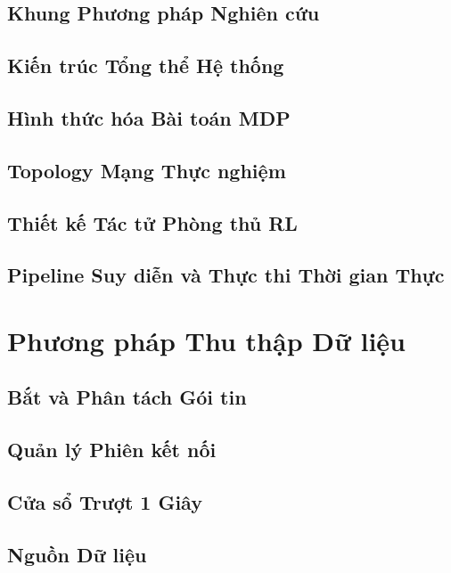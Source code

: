 \documentclass[12pt,a4paper,twoside]{report}
\begin{document}
\subsection{Khung Phương pháp Nghiên cứu}

\subsection{Kiến trúc Tổng thể Hệ thống}

\subsection{Hình thức hóa Bài toán MDP}

\subsection{Topology Mạng Thực nghiệm}

\subsection{Thiết kế Tác tử Phòng thủ RL}

\subsection{Pipeline Suy diễn và Thực thi Thời gian Thực}

\section{Phương pháp Thu thập Dữ liệu}

\subsection{Bắt và Phân tách Gói tin}

\subsection{Quản lý Phiên kết nối}

\subsection{Cửa sổ Trượt 1 Giây}

\subsection{Nguồn Dữ liệu}
\end{document}
